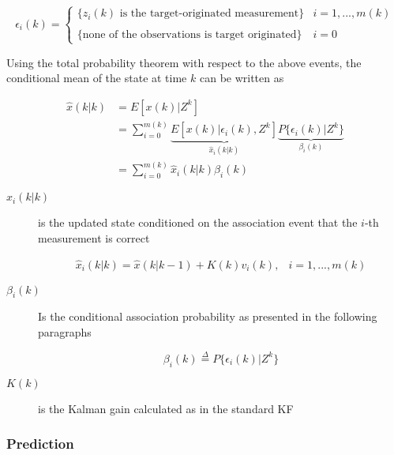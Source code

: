 \begin{equation}\label{eq:associationevents}
\epsilon_i(k)  = \left\{
\begin{array}{ll}
\{z_i(k) \text{ is the target-originated measurement} \} & i = 1,...,m(k) \\
\\
\{\text{none of the observations is target originated} \} & i=0
\end{array}\right.
\end{equation}

Using the total probability theorem with respect to the above events, the conditional mean of the state at time $k$ can be written as

\begin{equation}\label{eq:conditionalmean}
\begin{split}
\hat{x}(k|k) &= E[x(k)|Z^k] \\
&= \sum_{i=0}^{m(k)} \underbrace{E[x(k)|\epsilon_i(k),Z^k]}_{\hat{x}_i(k|k)} \underbrace{P\{\epsilon_i(k)|Z^k\}}_{\beta_i(k)}\\
&=\sum_{i=0}^{m(k)} \hat{x}_i(k|k) \beta_i(k)
\end{split}
\end{equation}
 
\begin{description}
	\item[$ \hat{x}_i(k|k) $ ] is the updated state conditioned on the association event that the $i$-th measurement is correct
	
	\begin{equation}\label{eq:PDAupdate}
	\begin{array}{ll}
			\hat{x}_i(k|k)= \hat{x}(k|k-1) + K(k)v_i(k), &i=1,...,m(k)
	\end{array}
	\end{equation}
	
	\item[$ \beta_i(k) $] Is the conditional association probability as presented in the following paragraphs
	
	\begin{equation}\label{eq:associationprobability}
	\beta_i(k) 	\overset{\Delta}{=} P\{\epsilon_i(k)|Z^k\}
	\end{equation}
	
	\item[$K(k)$] is the Kalman gain calculated as in the standard KF
	
	
\end{description}


\subsubsection{Prediction}

